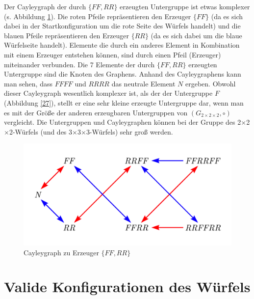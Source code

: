 \documentclass[12pt,a4paper, usenames, dvipsnames]{article}
\newcommand{\Gtwo}{\ensuremath{G_{2\times 2\times 2}}}
\newcommand{\Ttwo}{2$\times$2$\times$2-}
\newcommand{\Tthree}{3$\times$3$\times$3-}
\begin{document}
Der Cayleygraph der durch $\{ FF, RR \}$ erzeugten Untergruppe ist etwas komplexer (s. Abbildung \ref{28}). 
Die roten Pfeile repräsentieren den Erzeuger $\{FF\}$ (da es sich dabei in der Startkonfiguration um die rote Seite des Würfels handelt) und die blauen Pfeile repräsentieren den Erzeuger $\{RR\}$ (da es sich dabei um die blaue Würfelseite handelt).
Elemente die durch ein anderes Element in Kombination mit einem Erzeuger entstehen können, sind durch einen Pfeil (Erzeuger) miteinander verbunden.
Die 7 Elemente der durch  $\{ FF, RR \}$ erzeugten Untergruppe sind die Knoten des Graphens. 
Anhand des Cayleygraphens kann man sehen, dass $FFFF$ und $RRRR$ das neutrale Element $N$ ergeben.
Obwohl dieser Cayleygraph wesentlich komplexer ist, als der der Untergruppe $F$ (Abbildung \ref{27}), stellt er eine sehr kleine erzeugte Untergruppe dar, wenn man es mit der Größe der anderen erzeugbaren Untergruppen von $(\Gtwo, \circ)$ vergleicht. Die Untergruppen und Cayleygraphen können bei der Gruppe des \Ttwo Würfels (und des \Tthree Würfels) sehr groß werden.
\begin{figure}[h]
\centering
\includegraphics[scale=0.6]{Cayleygraph2.png}
\caption{Cayleygraph zu Erzeuger $\{ FF, RR \}$}
\label{28}
\end{figure}







%
%
%
%
%
%
%
%
%
%
%
%
%
%
%
%
%
\newpage

\section{Valide Konfigurationen des Würfels}
\end{document}
